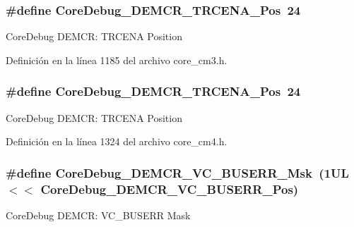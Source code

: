\subsubsection[{\texorpdfstring{Core\+Debug\+\_\+\+D\+E\+M\+C\+R\+\_\+\+T\+R\+C\+E\+N\+A\+\_\+\+Pos}{CoreDebug_DEMCR_TRCENA_Pos}}]{\setlength{\rightskip}{0pt plus 5cm}\#define Core\+Debug\+\_\+\+D\+E\+M\+C\+R\+\_\+\+T\+R\+C\+E\+N\+A\+\_\+\+Pos~24}\hypertarget{group___c_m_s_i_s___core_debug_ga6ff2102b98f86540224819a1b767ba39}{}\label{group___c_m_s_i_s___core_debug_ga6ff2102b98f86540224819a1b767ba39}
Core\+Debug D\+E\+M\+CR\+: T\+R\+C\+E\+NA Position 

Definición en la línea 1185 del archivo core\+\_\+cm3.\+h.

\subsubsection[{\texorpdfstring{Core\+Debug\+\_\+\+D\+E\+M\+C\+R\+\_\+\+T\+R\+C\+E\+N\+A\+\_\+\+Pos}{CoreDebug_DEMCR_TRCENA_Pos}}]{\setlength{\rightskip}{0pt plus 5cm}\#define Core\+Debug\+\_\+\+D\+E\+M\+C\+R\+\_\+\+T\+R\+C\+E\+N\+A\+\_\+\+Pos~24}\hypertarget{group___c_m_s_i_s___core_debug_ga6ff2102b98f86540224819a1b767ba39}{}\label{group___c_m_s_i_s___core_debug_ga6ff2102b98f86540224819a1b767ba39}
Core\+Debug D\+E\+M\+CR\+: T\+R\+C\+E\+NA Position 

Definición en la línea 1324 del archivo core\+\_\+cm4.\+h.

\subsubsection[{\texorpdfstring{Core\+Debug\+\_\+\+D\+E\+M\+C\+R\+\_\+\+V\+C\+\_\+\+B\+U\+S\+E\+R\+R\+\_\+\+Msk}{CoreDebug_DEMCR_VC_BUSERR_Msk}}]{\setlength{\rightskip}{0pt plus 5cm}\#define Core\+Debug\+\_\+\+D\+E\+M\+C\+R\+\_\+\+V\+C\+\_\+\+B\+U\+S\+E\+R\+R\+\_\+\+Msk~(1\+U\+L $<$$<$ Core\+Debug\+\_\+\+D\+E\+M\+C\+R\+\_\+\+V\+C\+\_\+\+B\+U\+S\+E\+R\+R\+\_\+\+Pos)}\hypertarget{group___c_m_s_i_s___core_debug_ga9d29546aefe3ca8662a7fe48dd4a5b2b}{}\label{group___c_m_s_i_s___core_debug_ga9d29546aefe3ca8662a7fe48dd4a5b2b}
Core\+Debug D\+E\+M\+CR\+: V\+C\+\_\+\+B\+U\+S\+E\+RR Mask 

